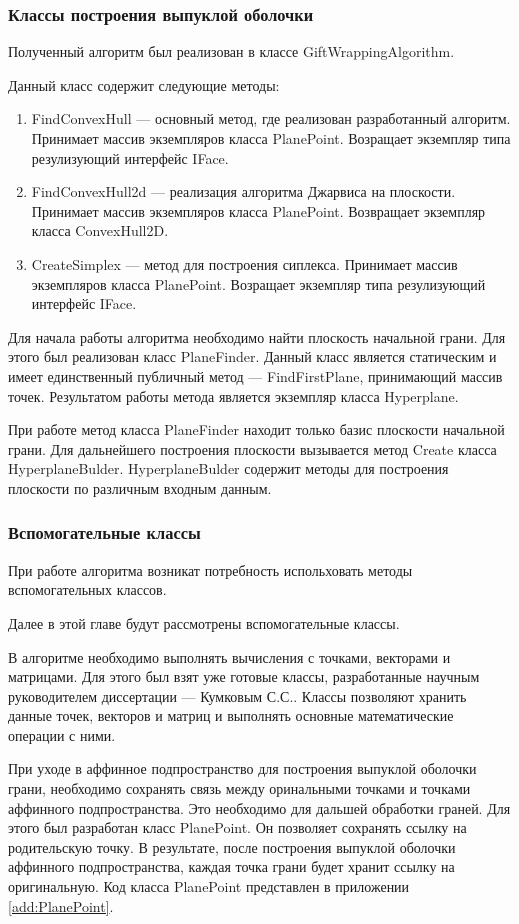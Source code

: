 \documentclass[14pt]{extarticle}
\begin{document}
\subsubsection{Классы построения выпуклой оболочки}
Полученный алгоритм был реализован в классе GiftWrappingAlgorithm.

Данный класс содержит следующие методы:
\begin{enumerate}[topsep=-0.5\parsep,itemsep=-0.5\parsep]
  \item FindConvexHull --- основный метод, где реализован разработанный алгоритм. Принимает массив экземпляров класса PlanePoint. Возращает экземпляр типа резулизующий интерфейс IFace.
  \item FindConvexHull2d --- реализация алгоритма Джарвиса на плоскости. Принимает массив экземпляров класса PlanePoint. Возвращает экземпляр класса ConvexHull2D.
  \item CreateSimplex --- метод для построения сиплекса. Принимает массив экземпляров класса PlanePoint. Возращает экземпляр типа резулизующий интерфейс IFace.
\end{enumerate}
\medskip

Для начала работы алгоритма необходимо найти плоскость начальной грани. Для этого был реализован класс PlaneFinder. Данный класс является статическим и имеет единственный публичный метод --- FindFirstPlane, принимающий массив точек. Результатом работы метода является экземпляр класса Hyperplane.

При работе метод класса PlaneFinder находит только базис плоскости начальной грани. Для дальнейшего построения плоскости вызывается метод Create класса HyperplaneBulder. HyperplaneBulder содержит методы для построения плоскости по различным входным данным.

\subsubsection{Вспомогательные классы}
При работе алгоритма возникат потребность испольховать методы вспомогательных классов.

Далее в этой главе будут рассмотрены вспомогательные классы.

В алгоритме необходимо выполнять вычисления с точками, векторами и матрицами. Для этого был взят уже готовые классы, разработанные научным руководителем диссертации --- Кумковым С.С.. Классы позволяют хранить данные точек, векторов и матриц и выполнять основные математические операции с ними.

При уходе в аффинное подпространство для построения выпуклой оболочки грани, необходимо сохранять связь между оринальными точками и точками аффинного подпространства. Это необходимо для дальшей обработки граней.  Для этого был разработан класс PlanePoint. Он позволяет сохранять ссылку на родительскую точку. В результате, после построения выпуклой оболочки аффинного подпространства, каждая точка грани будет хранит ссылку на оригинальную. Код класса PlanePoint представлен в приложении \ref{add:PlanePoint}.
\end{document}
